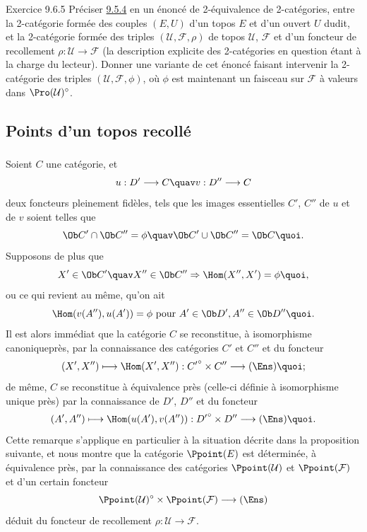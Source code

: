 \documentclass[10pt]{../fichiers-configuration-latex/smfart}
\begin{document}
\begin{enonce*}[remark]{Exercice 9.6.5}
Préciser \hyperref[IV.theo9.5.4]{9.5.4} en un énoncé de 2-équivalence de
2-catégories, entre la 2-catégorie formée des couples $(E,U)$ d'un
topos $E$ et d'un ouvert $U$ dudit, et la 2-catégorie formée des
triples $(\mathcal{U},\mathcal{F},\rho)$ de topos $\mathcal{U}$,
$\mathcal{F}$ et d'un foncteur de recollement
$\rho:\mathcal{U}\rightarrow \mathcal{F}$ (la description explicite
des 2-catégories en question étant à la charge du lecteur). Donner
une variante de cet énoncé faisant intervenir la 2-catégorie des
triples $(\mathcal{U},\mathcal{F}, \phi)$, où $\phi$ est maintenant
un faisceau sur $\mathcal{F}$ à valeurs dans
$\Pro(\mathcal{U})^{\circ}$.
\end{enonce*}

\subsection{Points d'un topos recollé}

\subsubsection{}
Soient $C$ une catégorie, et
$$
u:D'\longrightarrow C\quav v:D''\longrightarrow C
$$
deux foncteurs pleinement fidèles, tels que les images essentielles
$C'$, $C''$ de $u$ et de $v$ soient telles que
$$
\Ob C'\cap \Ob C''=\phi\quav \Ob C'\cup \Ob C''=\Ob C{\quoi}.
$$
Supposons de plus que
$$
X'\in \Ob C'\quav X''\in \Ob C''\Rightarrow
\Hom(X'',X')=\phi{\quoi},
$$
ou ce qui revient au même, qu'on ait
$$
\Hom(v(A''), u(A'))=\phi\mbox{ pour } A'\in \Ob D', A''\in \Ob
D''{\quoi}.
$$
Il est alors immédiat que la catégorie $C$ se reconstitue, à
isomorphisme canonique\pageoriginale près, par la connaissance des
catégories $C'$ et $C''$ et du foncteur
$$
(X',X'')\longmapsto \Hom(X',X''):{C'}^{\circ}\times
C''\longrightarrow (\Ens){\quoi};
$$
de même, $C$ se reconstitue à équivalence près (celle-ci définie à
isomorphisme unique près) par la connaissance de $D'$, $D''$ et du
foncteur
$$
(A',A'')\longmapsto \Hom(u(A'), v(A'')):{D'}^{\circ}\times
D''\longrightarrow (\Ens){\quoi}.
$$
Cette remarque s'applique en particulier à la situation décrite dans
la proposition suivante, et nous montre que la catégorie
$\Ppoint(E)$ est déterminée, à équivalence près, par la connaissance
des catégories $\Ppoint(\mathcal{U})$ et $\Ppoint(\mathcal{F})$ et
d'un certain foncteur
$$
\Ppoint(\mathcal{U})^{\circ}\times
\Ppoint(\mathcal{F})\longrightarrow (\Ens)
$$
déduit du foncteur de recollement $\rho:\mathcal{U}\rightarrow
\mathcal{F}$.
\end{document}
